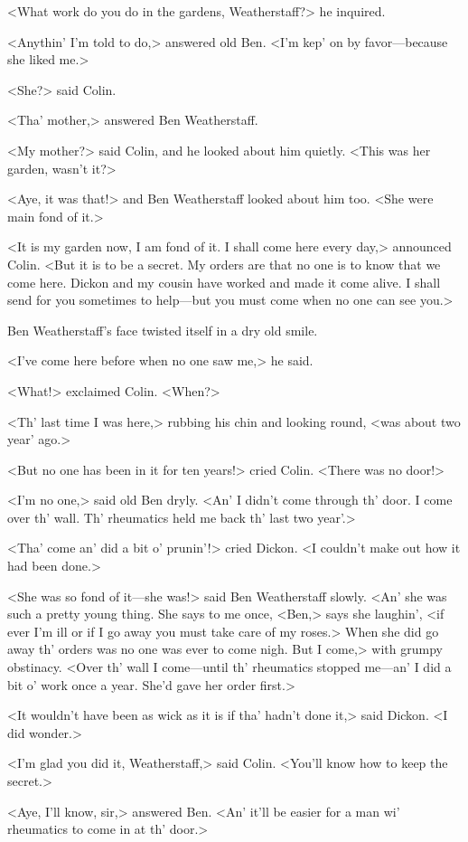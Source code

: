 <What work do you do in the gardens, Weatherstaff?> he inquired.

<Anythin' I'm told to do,> answered old Ben. <I'm kep' on by favor—because she liked me.>

<She?> said Colin.

<Tha' mother,> answered Ben Weatherstaff.

<My mother?> said Colin, and he looked about him quietly. <This was her garden, wasn't it?>

<Aye, it was that!> and Ben Weatherstaff looked about him too. <She were main fond of it.>

<It is my garden now, I am fond of it. I shall come here every day,> announced Colin. <But it is to be a secret. My orders are that no one is to know that we come here. Dickon and my cousin have worked and made it come alive. I shall send for you sometimes to help—but you must come when no one can see you.>

Ben Weatherstaff's face twisted itself in a dry old smile.

<I've come here before when no one saw me,> he said.

<What!> exclaimed Colin. <When?>

<Th' last time I was here,> rubbing his chin and looking round, <was about two year' ago.>

<But no one has been in it for ten years!> cried Colin. <There was no door!>

<I'm no one,> said old Ben dryly. <An' I didn't come through th' door. I come over th' wall. Th' rheumatics held me back th' last two year'.>

<Tha' come an' did a bit o' prunin'!> cried Dickon. <I couldn't make out how it had been done.>

<She was so fond of it—she was!> said Ben Weatherstaff slowly. <An' she was such a pretty young thing. She says to me once, <Ben,> says she laughin', <if ever I'm ill or if I go away you must take care of my roses.> When she did go away th' orders was no one was ever to come nigh. But I come,> with grumpy obstinacy. <Over th' wall I come—until th' rheumatics stopped me—an' I did a bit o' work once a year. She'd gave her order first.>

<It wouldn't have been as wick as it is if tha' hadn't done it,> said Dickon. <I did wonder.>

<I'm glad you did it, Weatherstaff,> said Colin. <You'll know how to keep the secret.>

<Aye, I'll know, sir,> answered Ben. <An' it'll be easier for a man wi' rheumatics to come in at th' door.>

